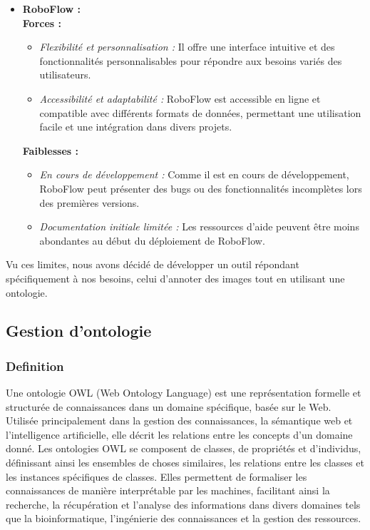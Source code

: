 \begin{itemize}
	\item \textbf{RoboFlow :} \\
		\textbf{Forces :}
		\begin{itemize}
			\item \textit{Flexibilité et personnalisation :} Il offre une interface intuitive et des fonctionnalités personnalisables pour répondre aux besoins variés des utilisateurs.
			\item \textit{Accessibilité et adaptabilité :} RoboFlow est accessible en ligne et compatible avec différents formats de données, permettant une utilisation facile et une intégration dans divers projets.
		\end{itemize}
		\textbf{Faiblesses :}
		\begin{itemize}
			\item \textit{En cours de développement :} Comme il est en cours de développement, RoboFlow peut présenter des bugs ou des fonctionnalités incomplètes lors des premières versions.
			\item \textit{Documentation initiale limitée :} Les ressources d'aide peuvent être moins abondantes au début du déploiement de RoboFlow.
		\end{itemize}
\end{itemize}
\quad Vu ces limites, nous avons décidé de développer un outil répondant spécifiquement à nos besoins, celui d'annoter des images tout en utilisant une ontologie.


\subsection{Gestion d'ontologie}
\subsubsection{Definition}
Une ontologie OWL (Web Ontology Language) est une représentation formelle et structurée de connaissances dans un domaine spécifique, basée sur le Web. Utilisée principalement dans la gestion des connaissances, la sémantique web et l'intelligence artificielle, elle décrit les relations entre les concepts d'un domaine donné. Les ontologies OWL se composent de classes, de propriétés et d'individus, définissant ainsi les ensembles de choses similaires, les relations entre les classes et les instances spécifiques de classes. Elles permettent de formaliser les connaissances de manière interprétable par les machines, facilitant ainsi la recherche, la récupération et l'analyse des informations dans divers domaines tels que la bioinformatique, l'ingénierie des connaissances et la gestion des ressources.
